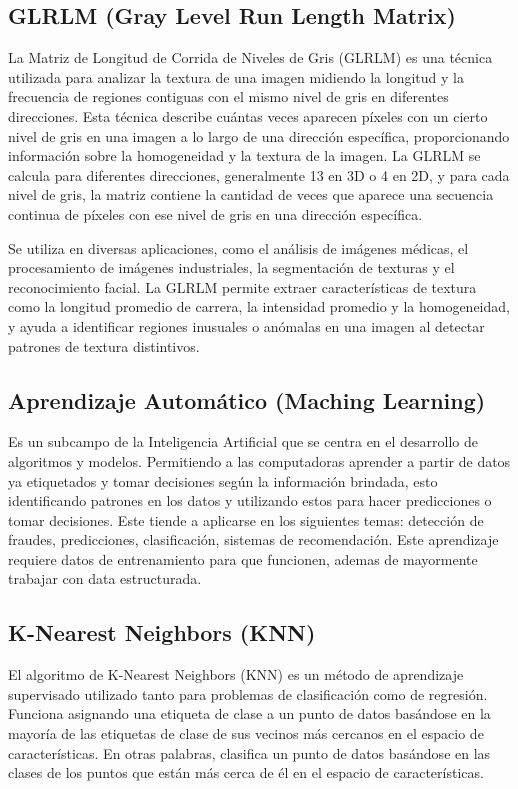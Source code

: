 \subsection{GLRLM (Gray Level Run Length Matrix)}
La Matriz de Longitud de Corrida de Niveles de Gris (GLRLM) es una técnica utilizada para analizar la textura de una imagen midiendo la longitud y la frecuencia de regiones contiguas con el mismo nivel de gris en diferentes direcciones. Esta técnica describe cuántas veces aparecen píxeles con un cierto nivel de gris en una imagen a lo largo de una dirección específica, proporcionando información sobre la homogeneidad y la textura de la imagen. La GLRLM se calcula para diferentes direcciones, generalmente 13 en 3D o 4 en 2D, y para cada nivel de gris, la matriz contiene la cantidad de veces que aparece una secuencia continua de píxeles con ese nivel de gris en una dirección específica.

Se utiliza en diversas aplicaciones, como el análisis de imágenes médicas, el procesamiento de imágenes industriales, la segmentación de texturas y el reconocimiento facial. La GLRLM permite extraer características de textura como la longitud promedio de carrera, la intensidad promedio y la homogeneidad, y ayuda a identificar regiones inusuales o anómalas en una imagen al detectar patrones de textura distintivos.


\subsection{Aprendizaje Automático  (Maching Learning)}
Es un subcampo de la Inteligencia Artificial que se centra en el desarrollo de algoritmos y modelos. Permitiendo a las computadoras aprender a partir de datos ya etiquetados y tomar decisiones según la información brindada, esto identificando patrones en los datos y utilizando estos para hacer predicciones o tomar decisiones.
Este tiende a aplicarse en los siguientes temas: detección de fraudes, predicciones, clasificación, sistemas de recomendación.
Este aprendizaje requiere datos de entrenamiento para que funcionen, ademas de mayormente trabajar con data estructurada.

\subsection{K-Nearest Neighbors (KNN)}
El algoritmo de K-Nearest Neighbors (KNN) es un método de aprendizaje supervisado utilizado tanto para problemas de clasificación como de regresión. Funciona asignando una etiqueta de clase a un punto de datos basándose en la mayoría de las etiquetas de clase de sus vecinos más cercanos en el espacio de características. En otras palabras, clasifica un punto de datos basándose en las clases de los puntos que están más cerca de él en el espacio de características.

